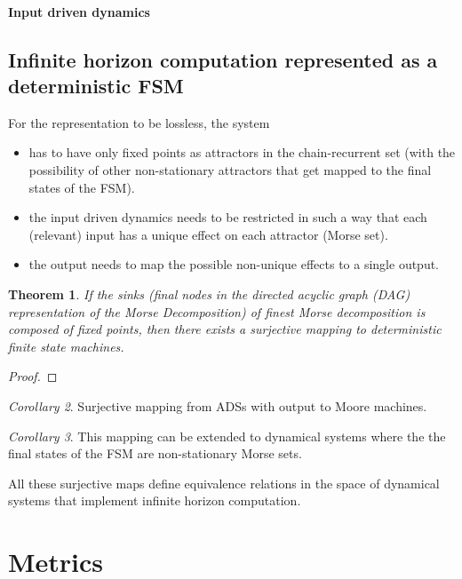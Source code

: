 \documentclass{scrartcl}
\newtheorem{theorem}{Theorem}
\theoremstyle{definition}
\theoremstyle{remark}
\newtheorem{corollary}[theorem]{Corollary}
\begin{document}
\paragraph{Input driven dynamics}



\subsection{Infinite horizon computation represented as a deterministic FSM}
For the representation to be lossless, the system 
\begin{itemize}
\item has to have only fixed points as attractors in the chain-recurrent set (with the possibility of other non-stationary attractors that get mapped to the final states of the FSM).
\item  the input driven dynamics needs to be restricted in such a way that each (relevant) input has a unique effect on each attractor (Morse set).
\item the output needs to map the possible non-unique effects to a single output.
\end{itemize}


\begin{theorem}
If the sinks (final nodes in the directed acyclic graph (DAG) representation of the Morse Decomposition) of finest Morse decomposition is composed of fixed points, then there exists a surjective mapping to deterministic finite state machines.
\end{theorem}

\begin{proof}

\end{proof}

\begin{corollary}
Surjective mapping from ADSs with output to Moore machines.
\end{corollary}

\begin{corollary}
This mapping can be extended to dynamical systems where the  the final states of the FSM are non-stationary Morse sets.
\end{corollary}

All these surjective maps define equivalence relations in the space of dynamical systems that implement infinite horizon computation.


\section{Metrics}
\end{document}

